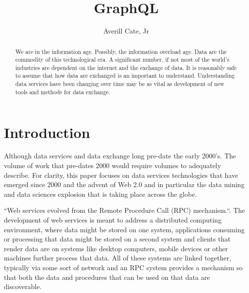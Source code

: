 
\title{GraphQL}

\author{Averill Cate, Jr}

\renewcommand{\shortauthors}{A. Cate, Jr}

\begin{abstract}
We are in the information age.  Possibly, the information overload age.
Data are the commodity of this technological era.  A significant number, if not
most of the world's industries are dependent on the internet and the exchange
of data.  It is reasonably safe to assume that how data are exchanged is
an important to understand.  Understanding data services have been changing
over time may be as vital as development of new tools and methods for data
exchange.
\end{abstract}


\maketitle

\section{Introduction}
Although data services and data exchange long pre-date the early 2000's.  The
volume of work that pre-dates 2000 would require volumes to adequately describe.
For clarity, this paper focuses on data services technologies that have emerged
since 2000 and the advent of Web 2.0 and in particular the data mining and
data sciences explosion that is taking place across the globe.

``Web services evolved from the Remote Procedure Call (RPC) mechanism.``\cite{hid505Kalin2009}.  
The development of web services is meant to address a distributed computing 
environment, where data might be stored on one system, applications consuming 
or processing that data might be stored on a second system and clients that 
render data are on systems like desktop computers, mobile devices or other 
machines further process that data.  All of these systems are linked together, 
typically via some sort of network and an RPC system provides a mechanism so 
that both the data and procedures that can be used on that data are 
discoverable\cite{hid505Kalin2009}.

